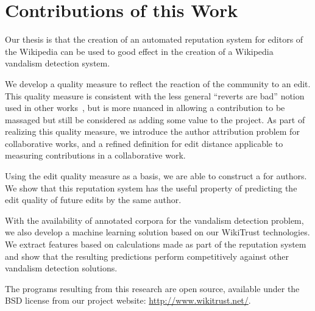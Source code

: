 \section{Contributions of this Work}

Our thesis is that the creation of an automated reputation system
for editors of the Wikipedia can be used to good effect in the creation
of a Wikipedia vandalism detection system.

We develop a quality measure to reflect the reaction of
the community to an edit.
This quality measure is consistent with the less general
``reverts are bad'' notion used in other
works~\cite{Smets2008,Itakura2009,Belani2010,West2010},
but is more nuanced in allowing a contribution to be massaged
but still be considered as adding some value to the project.
As part of realizing this quality measure, we introduce the
author attribution problem for collaborative works,
and a refined definition for edit distance applicable to
measuring contributions in a collaborative work.

Using the edit quality measure as a basis, we are able
to construct a  for authors.
We show that this reputation system has the useful property
of predicting the edit quality of future edits by the same
author.

With the availability of annotated corpora for the vandalism
detection problem, we also develop a machine learning solution based on our
WikiTrust technologies.
We extract features based on calculations made as part of the
reputation system and show that the resulting predictions perform
competitively against other vandalism detection solutions.

The programs resulting from this research are open source,
available under the BSD license from our project website:
\url{http://www.wikitrust.net/}.

